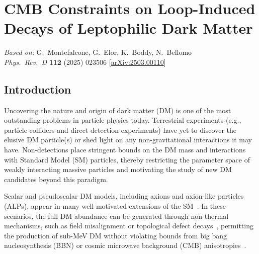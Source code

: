 \chapter{CMB Constraints on Loop-Induced Decays of Leptophilic Dark Matter}
\label{ch:cmb-leptophilic-dm}

\begin{center}
\textit{Based on:} G.~Montefalcone, G.~Elor, K.~Boddy, N.~Bellomo\\
\textit{Phys.\ Rev.\ D} \textbf{112} (2025) 023506
[\href{https://arxiv.org/abs/2503.00110}{arXiv:2503.00110}]
\end{center}
\vspace{1em}


\section{Introduction}
\label{sec:ch9-intro}

Uncovering the nature and origin of dark matter (DM) is one of the most outstanding problems in particle physics today.
Terrestrial experiments (e.g., particle colliders and direct detection experiments) have yet to discover the elusive DM particle(s) or shed light on any non-gravitational interactions it may have.
Non-detections place stringent bounds on the DM mass and interactions with Standard Model (SM) particles, thereby restricting the parameter space of weakly interacting massive particles and motivating the study of new DM candidates beyond this paradigm.

Scalar and pseudoscalar DM models, including axions and axion-like particles (ALPs), appear in many well motivated extensions of the SM~\cite{PhysRevLett.40.223, Adams:2022pbo,Choi:2020rgn,Raffelt:2006rj}.
In these scenarios, the full DM abundance can be generated through non-thermal mechanisms, such as field misalignment or topological defect decays~\cite{Batell:2022qvr, PRESKILL1983127, DINE1983137, DAVIS1986225, Gorghetto:2018myk, Gorghetto:2020qws, Lyth:1991ub, Co:2019jts, Co:2018mho, Co:2020dya, Cembranos:2019qlm}, permitting the production of sub-MeV DM without violating bounds from big bang nucleosynthesis (BBN) or cosmic microwave background (CMB) anisotropies~\cite{Boehm:2002yz,Serpico:2004nm,Nollett:2013pwa,Steigman:2014pfa,Nollett:2014lwa,Escudero:2018mvt,Sabti:2019mhn,Giovanetti:2021izc,An:2022sva,An:2024nsw}.

